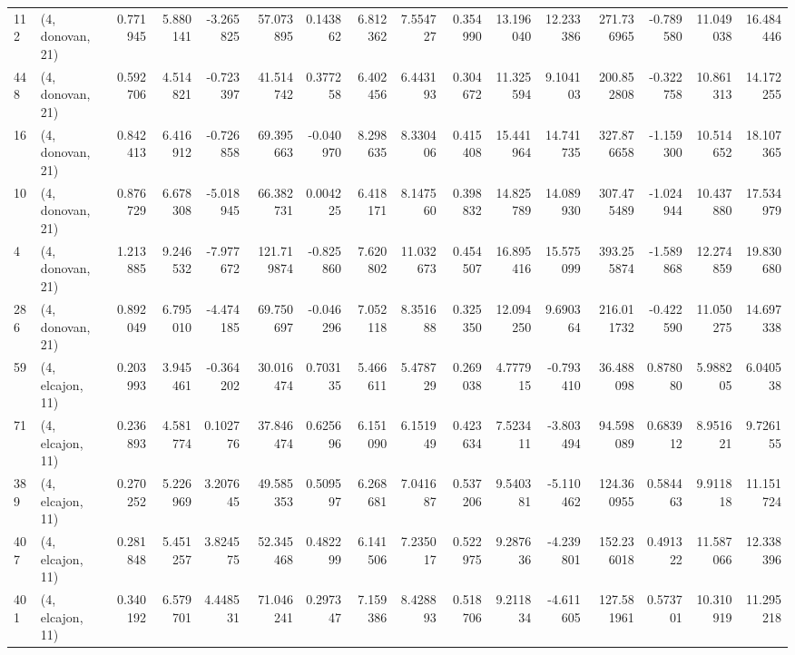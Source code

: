 \begin{tabular}{llrrrrrrrrrrrrrr}
112 &  (4, donovan, 21) &   0.771945 &   5.880141 &  -3.265825 &    57.073895 &   0.143862 &   6.812362 &   7.554727 &  0.354990 &  13.196040 &  12.233386 &   271.736965 &  -0.789580 &  11.049038 &  16.484446 \\
448 &  (4, donovan, 21) &   0.592706 &   4.514821 &  -0.723397 &    41.514742 &   0.377258 &   6.402456 &   6.443193 &  0.304672 &  11.325594 &   9.104103 &   200.852808 &  -0.322758 &  10.861313 &  14.172255 \\
16  &  (4, donovan, 21) &   0.842413 &   6.416912 &  -0.726858 &    69.395663 &  -0.040970 &   8.298635 &   8.330406 &  0.415408 &  15.441964 &  14.741735 &   327.876658 &  -1.159300 &  10.514652 &  18.107365 \\
10  &  (4, donovan, 21) &   0.876729 &   6.678308 &  -5.018945 &    66.382731 &   0.004225 &   6.418171 &   8.147560 &  0.398832 &  14.825789 &  14.089930 &   307.475489 &  -1.024944 &  10.437880 &  17.534979 \\
4   &  (4, donovan, 21) &   1.213885 &   9.246532 &  -7.977672 &   121.719874 &  -0.825860 &   7.620802 &  11.032673 &  0.454507 &  16.895416 &  15.575099 &   393.255874 &  -1.589868 &  12.274859 &  19.830680 \\
286 &  (4, donovan, 21) &   0.892049 &   6.795010 &  -4.474185 &    69.750697 &  -0.046296 &   7.052118 &   8.351688 &  0.325350 &  12.094250 &   9.690364 &   216.011732 &  -0.422590 &  11.050275 &  14.697338 \\
59  &  (4, elcajon, 11) &   0.203993 &   3.945461 &  -0.364202 &    30.016474 &   0.703135 &   5.466611 &   5.478729 &  0.269038 &   4.777915 &  -0.793410 &    36.488098 &   0.878080 &   5.988205 &   6.040538 \\
71  &  (4, elcajon, 11) &   0.236893 &   4.581774 &   0.102776 &    37.846474 &   0.625696 &   6.151090 &   6.151949 &  0.423634 &   7.523411 &  -3.803494 &    94.598089 &   0.683912 &   8.951621 &   9.726155 \\
389 &  (4, elcajon, 11) &   0.270252 &   5.226969 &   3.207645 &    49.585353 &   0.509597 &   6.268681 &   7.041687 &  0.537206 &   9.540381 &  -5.110462 &   124.360955 &   0.584463 &   9.911818 &  11.151724 \\
407 &  (4, elcajon, 11) &   0.281848 &   5.451257 &   3.824575 &    52.345468 &   0.482299 &   6.141506 &   7.235017 &  0.522975 &   9.287636 &  -4.239801 &   152.236018 &   0.491322 &  11.587066 &  12.338396 \\
401 &  (4, elcajon, 11) &   0.340192 &   6.579701 &   4.448531 &    71.046241 &   0.297347 &   7.159386 &   8.428893 &  0.518706 &   9.211834 &  -4.611605 &   127.581961 &   0.573701 &  10.310919 &  11.295218 \\

\end{tabular}

